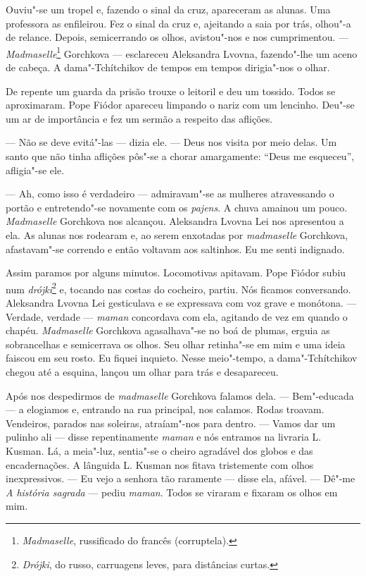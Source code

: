 Ouviu"-se um tropel e, fazendo o sinal da cruz, apareceram as alunas. Uma
professora as enfileirou. Fez o sinal da cruz e, ajeitando a saia por
trás, olhou"-a de relance. Depois, semicerrando os olhos, avistou"-nos e
nos cumprimentou. --- \emph{Madmaselle}\footnote{\emph{Madmaselle},
  russificado do francês (corruptela).} Gorchkova --- esclareceu
Aleksandra Lvovna, fazendo"-lhe um aceno de cabeça. A dama"-Tchítchikov de
tempos em tempos dirigia"-nos o olhar.

De repente um guarda da prisão trouxe o leitoril e deu um tossido. Todos
se aproximaram. Pope Fiódor apareceu limpando o nariz com um lencinho.
Deu"-se um ar de importância e fez um sermão a respeito das aflições.

--- Não se deve evitá"-las --- dizia ele. --- Deus nos visita por meio
delas. Um santo que não tinha aflições pôs"-se a chorar amargamente:
``Deus me esqueceu'', afligia"-se ele.

--- Ah, como isso é verdadeiro --- admiravam"-se as mulheres atravessando
o portão e entretendo"-se novamente com os \emph{pajens}. A chuva amainou
um pouco. \emph{Madmaselle} Gorchkova nos alcançou. Aleksandra Lvovna
Lei nos apresentou a ela. As alunas nos rodearam e, ao serem enxotadas
por \emph{madmaselle} Gorchkova, afastavam"-se correndo e então voltavam
aos saltinhos. Eu me senti indignado.

Assim paramos por alguns minutos. Locomotivas apitavam. Pope Fiódor
subiu num \emph{drójki}\footnote{\emph{Drójki}, do russo, carruagens
  leves, para distâncias curtas.} e, tocando nas costas do cocheiro,
partiu. Nós ficamos conversando. Aleksandra Lvovna Lei gesticulava e se
expressava com voz grave e monótona. --- Verdade, verdade ---
\emph{maman} concordava com ela, agitando de vez em quando o chapéu.
\emph{Madmaselle} Gorchkova agasalhava"-se no boá de plumas, erguia as
sobrancelhas e semicerrava os olhos. Seu olhar retinha"-se em mim e uma
ideia faiscou em seu rosto. Eu fiquei inquieto. Nesse meio"-tempo, a
dama"-Tchítchikov chegou até a esquina, lançou um olhar para trás e
desapareceu.

Após nos despedirmos de \emph{madmaselle} Gorchkova falamos dela. ---
Bem"-educada --- a elogiamos e, entrando na rua principal, nos calamos.
Rodas troavam. Vendeiros, parados nas soleiras, atraíam"-nos para dentro.
--- Vamos dar um pulinho ali --- disse repentinamente \emph{maman} e nós
entramos na livraria L. Kusman. Lá, a meia"-luz, sentia"-se o cheiro
agradável dos globos e das encadernações. A lânguida L. Kusman nos
fitava tristemente com olhos inexpressivos. --- Eu vejo a senhora tão
raramente --- disse ela, afável. --- Dê"-me \emph{A história sagrada} ---
pediu \emph{maman}. Todos se viraram e fixaram os olhos em mim.

